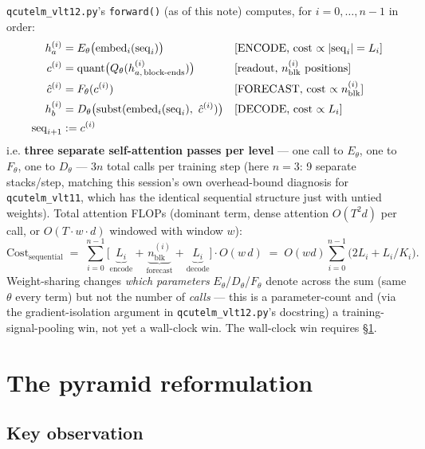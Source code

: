 \documentclass[11pt]{article}
\begin{document}
\texttt{qcutelm\_vlt12.py}'s \texttt{forward()} (as of this note) computes,
for $i = 0, \dots, n-1$ in order:
\begin{align}
  h^{(i)}_a &= E_\theta\big(\mathrm{embed}_i(\mathrm{seq}_i)\big)
    && \text{[ENCODE, cost $\propto |{\rm seq}_i| = L_i$]} \label{eq:encode}\\
  c^{(i)} &= \mathrm{quant}\big(Q_\theta(h^{(i)}_{a,\,\text{block-ends}})\big)
    && \text{[readout, $n^{(i)}_{\text{blk}}$ positions]} \\
  \hat c^{(i)} &= F_\theta(c^{(i)})
    && \text{[FORECAST, cost $\propto n^{(i)}_{\text{blk}}$]} \label{eq:forecast}\\
  h^{(i)}_b &= D_\theta\big(\mathrm{subst}(\mathrm{embed}_i(\mathrm{seq}_i),\ \hat c^{(i)})\big)
    && \text{[DECODE, cost $\propto L_i$]} \label{eq:decode}\\
  \mathrm{seq}_{i+1} &:= c^{(i)}
\end{align}
i.e. \textbf{three separate self-attention passes per level} — one call to
$E_\theta$, one to $F_\theta$, one to $D_\theta$ — $3n$ total calls per
training step (here $n=3$: 9 separate stacks/step, matching this session's
own overhead-bound diagnosis for \texttt{qcutelm\_vlt11}, which has the
identical sequential structure just with untied weights). Total attention
FLOPs (dominant term, dense attention $O(T^2 d)$ per call, or
$O(T \cdot w \cdot d)$ windowed with window $w$):
\begin{equation}
  \mathrm{Cost}_{\text{sequential}} \;=\; \sum_{i=0}^{n-1}
    \Big[\underbrace{L_i}_{\text{encode}} + \underbrace{n^{(i)}_{\text{blk}}}_{\text{forecast}}
    + \underbrace{L_i}_{\text{decode}}\Big] \cdot O(w\, d)
  \;=\; O(w d) \sum_{i=0}^{n-1} \big(2 L_i + L_i/K_i\big).
  \label{eq:seq-cost}
\end{equation}
Weight-sharing changes \emph{which parameters} $E_\theta$/$D_\theta$/$F_\theta$
denote across the sum (same $\theta$ every term) but not the number of
\emph{calls} — this is a parameter-count and (via the gradient-isolation
argument in \texttt{qcutelm\_vlt12.py}'s docstring) a training-signal-pooling
win, not yet a wall-clock win. The wall-clock win requires \S\ref{sec:pyramid}.

\section{The pyramid reformulation}
\label{sec:pyramid}

\subsection{Key observation}
\end{document}
